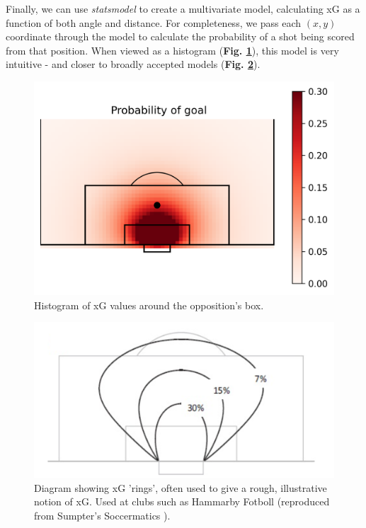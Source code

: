 \documentclass{l4proj}
\begin{document}
Finally, we can use \textit{statsmodel} to create a multivariate model, calculating xG as a function of both angle and distance. For completeness, we pass each $(x, y)$ coordinate through the model to calculate the probability of a shot being scored from that position. When viewed as a histogram (\textbf{Fig. \ref{fig:xgz}}), this model is very intuitive - and closer to broadly accepted models (\textbf{Fig. \ref{fig:xgsum}}).

\begin{figure}[h]
    \centering
    \includegraphics[scale=0.6]{images/xgplot2.png}   
    \caption{Histogram of xG values around the opposition's box.}
    \label{fig:xgz} 
\end{figure}

\begin{figure}[h]
    \centering
    \includegraphics[scale=0.4]{images/sumpterxG.png}   
    \caption{Diagram showing xG 'rings', often used to give a rough, illustrative notion of xG. Used at clubs such as Hammarby Fotboll (reproduced from Sumpter's Soccermatics \cite{sump1}).}
    \label{fig:xgsum} 
\end{figure}
\end{document}

